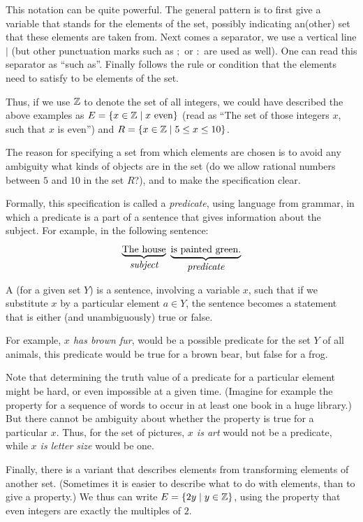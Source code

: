 This notation can be quite powerful. The general pattern is to first
give a variable that stands for the elements of the set, possibly indicating
an(other) set that these elements are taken from. Next comes a separator,
we use a vertical line $\mid$ (but other punctuation marks such as $;$ or
$:$ are used as well). One can read this separator as ``such as''.
Finally follows the rule or condition that the elements need to satisfy to
be elements of the set.

Thus, if we use ${\mathbb Z}$ to denote the set of all integers, we could have
described the above examples as
$E=\{x\in{\mathbb Z}\mid \mbox{$x$ even}\}$ (read as ``The set of those integers $x$,
such that $x$ is even'') and $R=\{x\in{\mathbb Z}\mid 5\le x\le 10\}$.

The reason for specifying a set from which elements are chosen is to avoid
any ambiguity what kinds of objects are in the set (do we allow rational
numbers between $5$ and $10$ in the set $R$?), and to make the specification
clear.

Formally, this specification is called a {\em predicate}, using language from
grammar, in which a predicate is a part of a sentence that gives information
about the subject. For example, in the following sentence:
\[
\underbrace{\mbox{The house}}_{\mbox{{\em subject}}}\ 
\underbrace{\mbox{is painted green.}}_{\mbox{{\em predicate}}}
\]
\begin{defn}
A  (for a given set $Y$) is a sentence, involving a
variable $x$, such that if we substitute $x$ by a particular element $a\in
Y$, the sentence becomes a statement that is either (and unambiguously)
true or false.
\end{defn}

For example, {\em $x$ has brown fur}, would be a possible predicate for the
set $Y$ of all animals, this predicate would be true for a brown bear, but
false for a frog.

Note that
determining the truth value of a predicate for a particular element
might be hard, or even impossible at a given time. (Imagine for example the
property for a sequence of words to occur in at least one book in a huge
library.)
But there cannot be ambiguity about whether the property is true for a
particular $x$. Thus, for
the set of pictures, {\em $x$ is art} would not be a predicate, while
{\em $x$ is letter size} would be one.
\smallskip

Finally, there is a variant that describes elements from transforming
elements of another set. (Sometimes
it is easier to describe what to do with elements, than to
give a property.) 
We thus can write
$E=\{2y\mid y\in{\mathbb Z}\}$, using the property that even integers are exactly the
multiples of $2$.
\smallskip

